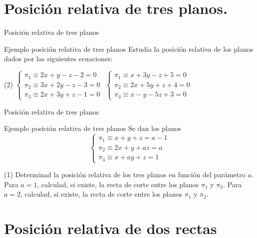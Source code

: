 \documentclass[8pt]{beamer}
\begin{document}
\section{Posición relativa de tres planos.}

\begin{frame}{Posición relativa de tres planos}
\begin{exampleblock}{Ejemplo posición relativa de tres planos}
Estudia la posición relativa de los planos dados por las siguientes ecuaciones:
\begin{tasks}[label=\alph*)](2)
\task $\begin{cases} \pi_1 \equiv 2x+y-z-2=0 \\ \pi_2 \equiv 3x+2y-z-3=0 \\ \pi_3 \equiv 2x+3y+z-1=0 \end{cases} $
\task $\begin{cases} \pi_1 \equiv x+3y-z+5=0 \\ \pi_2 \equiv 2x+5y+z+4=0 \\ \pi_3 \equiv x-y-5z+3=0 \end{cases} $
\end{tasks}

\end{exampleblock}
\end{frame}

\begin{frame}{Posición relativa de tres planos}
\begin{exampleblock}{Ejemplo posición relativa de tres planos}
Se dan los planos \[ \begin{cases} \pi_1 \equiv  x + y + z = a - 1 \\ \pi_2 \equiv  2x + y + az = a \\\pi_3 \equiv  x + ay + z = 1 \end{cases} \]
\begin{tasks}[label=\alph*)](1)
\task Determinad la posición relativa de los tres planos en función del parámetro $a$. 
\task  Para $a = 1$, calculad, si existe, la recta de corte entre los planos $\pi_1$ y $\pi_3$.
\task  Para $a = 2$, calculad, si existe, la recta de corte entre los planos $\pi_1$ y $\pi_2$.
\end{tasks}
\end{exampleblock}

\end{frame}

\section{Posición relativa de dos rectas}
\end{document}

